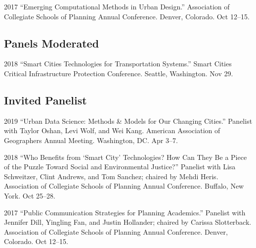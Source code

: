 \documentclass[12pt,letterpaper]{report}
\begin{document}
	\begin{tablist}
		
		\item[2017] \tab \enquote{Emerging Computational Methods in Urban Design.} Association of Collegiate Schools of Planning Annual Conference. Denver, Colorado. Oct 12--15.
		
	\end{tablist}
	
	\subsection*{Panels Moderated}
	
	\begin{tablist}
		
		\item[2018] \tab \enquote{Smart Cities Technologies for Transportation Systems.} Smart Cities Critical Infrastructure Protection Conference. Seattle, Washington. Nov 29.
		
	\end{tablist}
	
	\subsection*{Invited Panelist}
	
	\begin{tablist}
		
		\item[2019] \tab \enquote{Urban Data Science: Methods \& Models for Our Changing Cities.} Panelist with Taylor Oshan, Levi Wolf, and Wei Kang. American Association of Geographers Annual Meeting. Washington, DC. Apr 3--7.
		
		\item[2018] \tab \enquote{Who Benefits from \enquote{Smart City} Technologies? How Can They Be a Piece of the Puzzle Toward Social and Environmental Justice?} Panelist with Lisa Schweitzer, Clint Andrews, and Tom Sanchez; chaired by Mehdi Heris. Association of Collegiate Schools of Planning Annual Conference. Buffalo, New York. Oct 25--28.
		
		\item[2017] \tab \enquote{Public Communication Strategies for Planning Academics.} Panelist with Jennifer Dill, Yingling Fan, and Justin Hollander; chaired by Carissa Slotterback. Association of Collegiate Schools of Planning Annual Conference. Denver, Colorado. Oct 12--15.
		
	\end{tablist}
	
\end{document}
